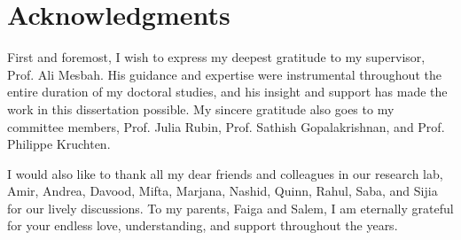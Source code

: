 
\chapter{Acknowledgments}

First and foremost, I wish to express my deepest gratitude 
to my supervisor, Prof. Ali Mesbah. His guidance and expertise 
were instrumental throughout the entire duration of my 
doctoral studies, and his insight and support has made the work in this 
dissertation possible. My sincere gratitude also goes to my  committee members, Prof. Julia Rubin, Prof. Sathish Gopalakrishnan, and Prof. Philippe Kruchten. 

I would also like to thank all my dear friends and colleagues in our research lab, 
Amir, Andrea, Davood, Mifta, Marjana, Nashid, Quinn, Rahul, Saba, and Sijia for 
our lively discussions.  
To my parents, Faiga and Salem, I am eternally grateful for your endless 
love, understanding, and support throughout the years. 
